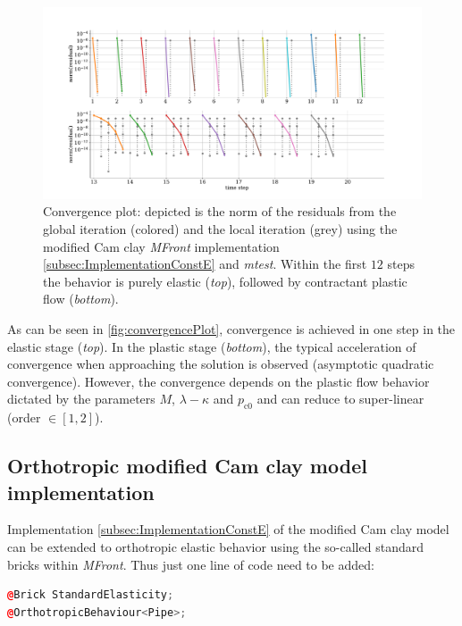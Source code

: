\documentclass[paper=a4, twoside, pagesize]{scrartcl}
\renewcommand{\c}{\text{c}}
\newcommand{\minus}{-}
\begin{document}
\begin{figure}[h!]%
  \includegraphics[width=1.04\textwidth]{img/SemiExplicitModifiedCamClay_OpenGeoSys2023/convergence_plot.pdf}
  \caption{Convergence plot: depicted is the norm of the residuals from the global iteration (colored) and the local iteration (grey) using the modified Cam clay \textsl{MFront} implementation \ref{subsec:ImplementationConstE} and \textsl{mtest}. Within the first $12$ steps the behavior is purely elastic (\textsl{top}), followed by contractant plastic flow (\textsl{bottom}).}\label{fig:convergencePlot}
\end{figure}


As can be seen in \autoref{fig:convergencePlot}, convergence is achieved in one step in the elastic stage (\textsl{top}). In the plastic stage (\textsl{bottom}), the typical acceleration of convergence when approaching the solution is observed (asymptotic quadratic convergence). However, the convergence depends on the plastic flow behavior dictated by the parameters $M$, $\lambda\minus\kappa$ and $p_{\c0}$ and can reduce to super-linear (order $\in [1,2]$). 

\subsection{Orthotropic modified Cam clay model implementation}

Implementation \ref{subsec:ImplementationConstE} of the modified Cam clay model can be extended to orthotropic elastic behavior using the so-called standard bricks within \textsl{MFront}. Thus just one line of code need to be added:

\begin{lstlisting}[language={C++}]
@Brick StandardElasticity;
@OrthotropicBehaviour<Pipe>;
\end{lstlisting}
\end{document}
